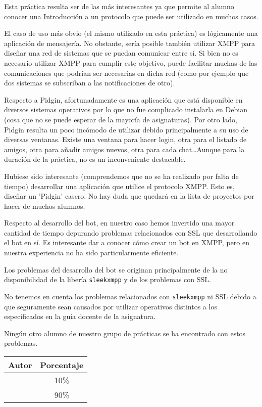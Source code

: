 Esta práctica resulta ser de las más interesantes ya que permite al alumno conocer una Introducción
a un protocolo que puede ser utilizado en muchos casos.

El caso de uso más obvio (el mismo utilizado en esta práctica) es lógicamente una aplicación de
mensajería. No obstante, sería posible también utilizar XMPP para diseñar una red de sistemas
que se puedan comunicar entre sí. Si bien no es necesario utilizar XMPP para cumplir este objetivo,
puede facilitar muchas de las comunicaciones que podrían ser necesarias en dicha red
(como por ejemplo que dos sistemas se subscriban a las notificaciones de otro).

Respecto a Pidgin, afortunadamente es una aplicación que está disponible en diversos sistemas operativos
por lo que no fue complicado instalarla en Debian (cosa que no se puede esperar de la mayoría de asignaturas).
Por otro lado, Pidgin resulta un poco incómodo de utilizar debido principalmente a su uso de diversas ventanas.
Existe una ventana para hacer login, otra para el listado de amigos, otra para añadir amigos nuevos,
otra para cada chat\dots Aunque para la duración de la práctica, no es un inconveniente destacable.

Hubiese sido interesante (comprendemos que no se ha realizado por falta de tiempo) desarrollar una
aplicación que utilice el protocolo XMPP.
Esto es, diseñar un 'Pidgin' casero.
No hay duda que quedará en la lista de proyectos por hacer de muchos alumnos.

Respecto al desarrollo del bot, en nuestro caso hemos invertido una mayor cantidad de tiempo depurando
problemas relacionados con SSL que desarrollando el bot en sí.
Es interesante dar a conocer cómo crear un bot en XMPP, pero en nuestra experiencia no ha sido particularmente
eficiente.

Los problemas del desarrollo del bot se originan principalmente de la no disponibilidad de la libería
\verb#sleekxmpp# y de los problemas con SSL.

\begin{notebox}
	No tenemos en cuenta los problemas relacionados con \verb#sleekxmpp# ni SSL debido a que seguramente
	sean causados por utilizar operativos distintos a los especificados en la guía docente de
	la asignatura.

	Ningún otro alumno de nuestro grupo de prácticas se ha encontrado con estos problemas.
\end{notebox}

\begin{center}
	\begin{tabular}{|c|c|}
		\hline
		\textbf{Autor} & \textbf{Porcentaje} \\
		\hline
		\hline
		\authorOne & 10\% \\
		\authorTwo & 90\% \\
		\hline
	\end{tabular}
\end{center}